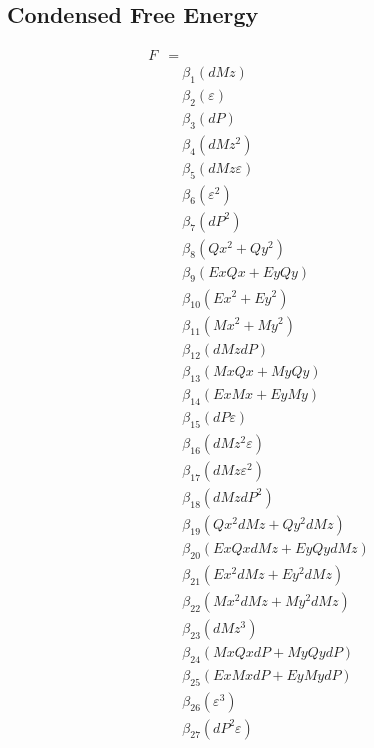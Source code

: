 \documentclass{article}
\begin{document}
\subsection*{Condensed Free Energy}

\begin{align*}
F &= \\
&\quad \beta_{1} \left(dMz\right) \\
&\quad \beta_{2} \left(ε\right) \\
&\quad \beta_{3} \left(dP\right) \\
&\quad \beta_{4} \left(dMz^{2}\right) \\
&\quad \beta_{5} \left(dMz ε\right) \\
&\quad \beta_{6} \left(ε^{2}\right) \\
&\quad \beta_{7} \left(dP^{2}\right) \\
&\quad \beta_{8} \left(Qx^{2} + Qy^{2}\right) \\
&\quad \beta_{9} \left(Ex Qx + Ey Qy\right) \\
&\quad \beta_{10} \left(Ex^{2} + Ey^{2}\right) \\
&\quad \beta_{11} \left(Mx^{2} + My^{2}\right) \\
&\quad \beta_{12} \left(dMz dP\right) \\
&\quad \beta_{13} \left(Mx Qx + My Qy\right) \\
&\quad \beta_{14} \left(Ex Mx + Ey My\right) \\
&\quad \beta_{15} \left(dP ε\right) \\
&\quad \beta_{16} \left(dMz^{2} ε\right) \\
&\quad \beta_{17} \left(dMz ε^{2}\right) \\
&\quad \beta_{18} \left(dMz dP^{2}\right) \\
&\quad \beta_{19} \left(Qx^{2} dMz + Qy^{2} dMz\right) \\
&\quad \beta_{20} \left(Ex Qx dMz + Ey Qy dMz\right) \\
&\quad \beta_{21} \left(Ex^{2} dMz + Ey^{2} dMz\right) \\
&\quad \beta_{22} \left(Mx^{2} dMz + My^{2} dMz\right) \\
&\quad \beta_{23} \left(dMz^{3}\right) \\
&\quad \beta_{24} \left(Mx Qx dP + My Qy dP\right) \\
&\quad \beta_{25} \left(Ex Mx dP + Ey My dP\right) \\
&\quad \beta_{26} \left(ε^{3}\right) \\
&\quad \beta_{27} \left(dP^{2} ε\right) \\

\end{align*}
\end{document}
